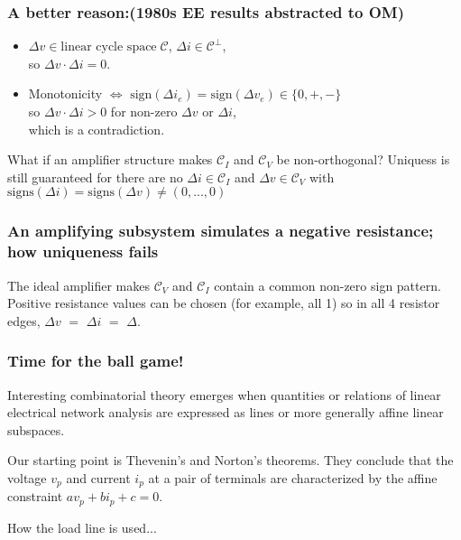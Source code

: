 \documentclass{beamer}
\begin{document}
\begin{frame}
\frametitle{A better reason:(1980s EE results abstracted to OM)}

\begin{itemize}
\item
$\Delta v \in \text{linear cycle space}\; \mathcal{C}$,
$\Delta i \in \mathcal{C}^{\perp}$, \\
so $\Delta v \cdot \Delta i = 0$.  
\item
Monotonicity $\Leftrightarrow$ 
$\text{sign}(\Delta i_e) = \text{sign}(\Delta v_e) \in \{0, +, -\}$\\
so
$\Delta v \cdot \Delta i > 0$ for non-zero $\Delta v$ or $\Delta i$,\\
which is a contradiction.
\end{itemize}


What if an amplifier structure makes $\mathcal{C}_I$ and $\mathcal{C}_V$ be
non-orthogonal?  Uniquess is still guaranteed for there are no
$\Delta i\in \mathcal{C}_I$ and $\Delta v \in \mathcal{C}_V$ with
$\text{signs}(\Delta i) = \text{signs}(\Delta v) \neq (0, ..., 0)$



\end{frame}

\begin{frame}
\frametitle{An amplifying subsystem simulates a negative resistance; 
how uniqueness fails}





\begin{minipage}[b]{2.3in}
The ideal amplifier makes $\mathcal{C}_V$ and
$\mathcal{C}_I$ contain a common non-zero sign pattern.
Positive resistance values can be chosen (for example, all 1) so 
in all 4 resistor edges, $\Delta v$ $=$ $\Delta i$ $=$ $\Delta$.
\end{minipage}



\end{frame}


\begin{frame}
\frametitle{Time for the ball game!}
\end{frame}


\begin{frame}
Interesting combinatorial theory emerges when quantities or relations
of linear electrical network analysis are expressed as lines or more
generally affine linear subspaces.

Our starting point is Thevenin's and Norton's theorems.  They conclude that
the voltage $v_p$ and current $i_p$ at a pair of terminals are characterized
by the affine constraint $av_p + bi_p + c = 0$.  

How the load line is used...

\end{frame}
\end{document}
